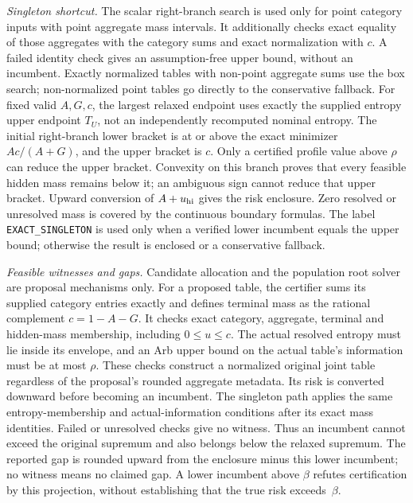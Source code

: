 \documentclass[10pt]{article}
\begin{document}
\emph{Singleton shortcut.} The scalar right-branch search is used only for point category inputs with point aggregate mass intervals. It additionally checks exact equality of those aggregates with the category sums and exact normalization with $c$. A failed identity check gives an assumption-free upper bound, without an incumbent. Exactly normalized tables with non-point aggregate sums use the box search; non-normalized point tables go directly to the conservative fallback. For fixed valid $A,G,c$, the largest relaxed endpoint uses exactly the supplied entropy upper endpoint $T_U$, not an independently recomputed nominal entropy. The initial right-branch lower bracket is at or above the exact minimizer $Ac/(A+G)$, and the upper bracket is $c$. Only a certified profile value above $\rho$ can reduce the upper bracket. Convexity on this branch proves that every feasible hidden mass remains below it; an ambiguous sign cannot reduce that upper bracket. Upward conversion of $A+u_{\rm hi}$ gives the risk enclosure. Zero resolved or unresolved mass is covered by the continuous boundary formulas. The label \texttt{EXACT\_SINGLETON} is used only when a verified lower incumbent equals the upper bound; otherwise the result is enclosed or a conservative fallback.

\emph{Feasible witnesses and gaps.} Candidate allocation and the population root solver are proposal mechanisms only. For a proposed table, the certifier sums its supplied category entries exactly and defines terminal mass as the rational complement $c=1-A-G$. It checks exact category, aggregate, terminal and hidden-mass membership, including $0\le u\le c$. The actual resolved entropy must lie inside its envelope, and an Arb upper bound on the actual table's information must be at most $\rho$. These checks construct a normalized original joint table regardless of the proposal's rounded aggregate metadata. Its risk is converted downward before becoming an incumbent. The singleton path applies the same entropy-membership and actual-information conditions after its exact mass identities. Failed or unresolved checks give no witness. Thus an incumbent cannot exceed the original supremum and also belongs below the relaxed supremum. The reported gap is rounded upward from the enclosure minus this lower incumbent; no witness means no claimed gap. A lower incumbent above $\beta$ refutes certification by this projection, without establishing that the true risk exceeds~$\beta$.
\end{document}
